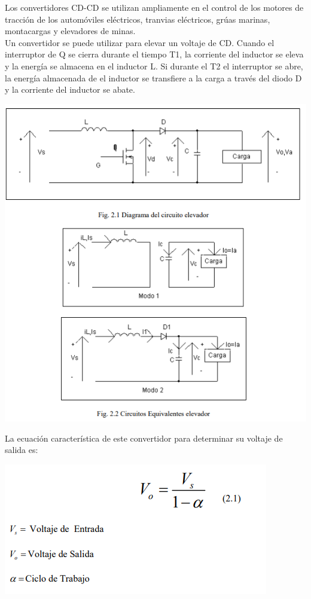 \documentclass[12pt,a4paper]{article}
\begin{document}
\begin{flushleft}
Los convertidores CD-CD se utilizan ampliamente en el control de los motores de tracción de los automóviles eléctricos, tranvias eléctricos, grúas marinas, montacargas y elevadores de minas.\\
Un convertidor se puede utilizar para elevar un voltaje de CD. Cuando el interruptor de Q se cierra durante el tiempo T1, la corriente del inductor se eleva y la energía se almacena en el inductor L. Si durante el T2 el interruptor se abre, la energía almacenada de el inductor se transfiere a la carga a través del diodo D y la corriente del inductor se abate.
\begin{center}
\includegraphics[scale=1]{imagenes/cdcdind.png} 
\end{center}
\newpage
La ecuación característica de este convertidor para determinar su voltaje de salida es: 
\begin{center}
\includegraphics[scale=1]{imagenes/dcdc2.PNG} 

\end{center}
\end{flushleft}
\end{document}
